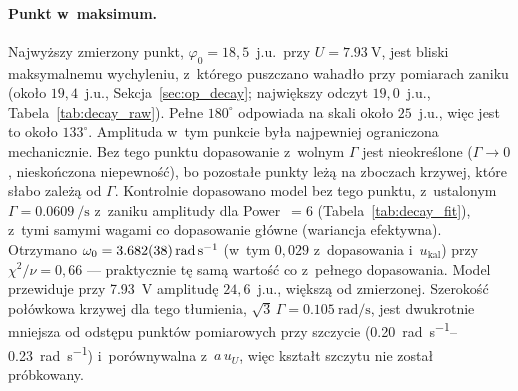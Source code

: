 \documentclass[12pt, a4paper]{article}
\begin{document}
\paragraph{Punkt w~maksimum.}
Najwyższy zmierzony punkt, $\varphi_0 = 18{,}5$~j.u.\ przy $U = \SI{7.93}{\volt}$,
jest bliski maksymalnemu wychyleniu, z~którego puszczano wahadło przy pomiarach zaniku
(około $19{,}4$~j.u., Sekcja~\ref{sec:op_decay}; największy odczyt $19{,}0$~j.u.,
Tabela~\ref{tab:decay_raw}). Pełne $180^{\circ}$
odpowiada na skali około $25$~j.u., więc jest to około $133^{\circ}$. Amplituda w~tym
punkcie była najpewniej ograniczona mechanicznie. Bez tego punktu dopasowanie
z~wolnym $\Gamma$ jest nieokreślone ($\Gamma \to 0$, nieskończona niepewność), bo
pozostałe punkty leżą na zboczach krzywej, które słabo zależą od $\Gamma$.
Kontrolnie dopasowano model bez tego punktu, z~ustalonym $\Gamma = \SI{0.0609}{\per\second}$
z~zaniku amplitudy dla Power~$=6$ (Tabela~\ref{tab:decay_fit}), z~tymi samymi wagami
co dopasowanie główne (wariancja efektywna). Otrzymano
$\omega_0 = \SI{3.682 \pm 0.038}{\radian\per\second}$ (w~tym $0{,}029$ z~dopasowania
i~$u_\text{kal}$) przy $\chi^2/\nu = 0{,}66$ --- praktycznie tę samą wartość co
z~pełnego dopasowania. Model przewiduje przy \SI{7.93}{\volt} amplitudę $24{,}6$~j.u.,
większą od zmierzonej. Szerokość połówkowa
krzywej dla tego tłumienia, $\sqrt{3}\,\Gamma = \SI{0.105}{\radian\per\second}$, jest
dwukrotnie mniejsza od odstępu punktów pomiarowych przy szczycie
(\SIrange{0.20}{0.23}{\radian\per\second}) i~porównywalna z~$a\,u_U$, więc kształt
szczytu nie został próbkowany.
\end{document}
